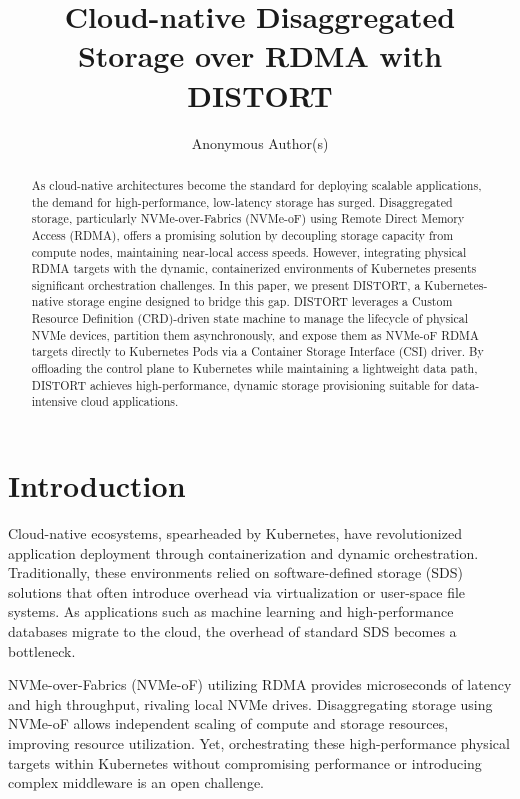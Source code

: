 \documentclass[sigconf]{acmart}
\begin{document}
\title{Cloud-native Disaggregated Storage over RDMA with DISTORT}

\author{Anonymous Author(s)}

\begin{abstract}
As cloud-native architectures become the standard for deploying scalable applications, the demand for high-performance, low-latency storage has surged. Disaggregated storage, particularly NVMe-over-Fabrics (NVMe-oF) using Remote Direct Memory Access (RDMA), offers a promising solution by decoupling storage capacity from compute nodes, maintaining near-local access speeds. However, integrating physical RDMA targets with the dynamic, containerized environments of Kubernetes presents significant orchestration challenges. In this paper, we present DISTORT, a Kubernetes-native storage engine designed to bridge this gap. DISTORT leverages a Custom Resource Definition (CRD)-driven state machine to manage the lifecycle of physical NVMe devices, partition them asynchronously, and expose them as NVMe-oF RDMA targets directly to Kubernetes Pods via a Container Storage Interface (CSI) driver. By offloading the control plane to Kubernetes while maintaining a lightweight data path, DISTORT achieves high-performance, dynamic storage provisioning suitable for data-intensive cloud applications.
\end{abstract}

\maketitle

\section{Introduction}
Cloud-native ecosystems, spearheaded by Kubernetes, have revolutionized application deployment through containerization and dynamic orchestration. Traditionally, these environments relied on software-defined storage (SDS) solutions that often introduce overhead via virtualization or user-space file systems. As applications such as machine learning and high-performance databases migrate to the cloud, the overhead of standard SDS becomes a bottleneck.

NVMe-over-Fabrics (NVMe-oF) utilizing RDMA provides microseconds of latency and high throughput, rivaling local NVMe drives. Disaggregating storage using NVMe-oF allows independent scaling of compute and storage resources, improving resource utilization. Yet, orchestrating these high-performance physical targets within Kubernetes without compromising performance or introducing complex middleware is an open challenge.
\end{document}
